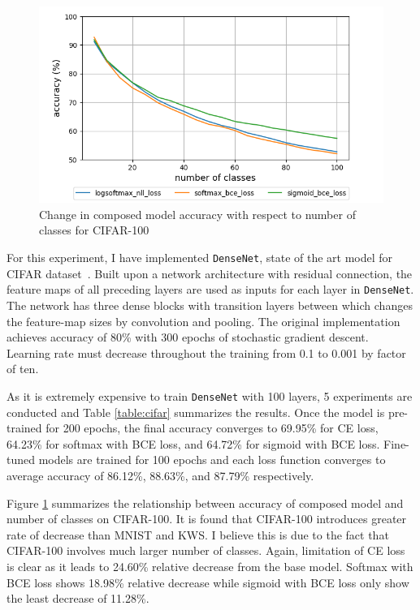 \documentclass{article}
\begin{document}
\begin{figure}[t]
    \centering
    \includegraphics[scale=0.4,trim={0mm 0mm 0mm 0mm},clip]{cifar100.png}
    \caption{Change in composed model accuracy with respect to number of classes for CIFAR-100}
    \label{figure:composed_cifar}
\end{figure}


For this experiment, I have implemented \texttt{DenseNet}, state of the art model for CIFAR dataset~\cite{huang2017densely}. Built upon a network architecture with residual connection, the feature maps of all preceding layers are used as inputs for each layer in \texttt{DenseNet}. The network has three dense blocks with transition layers between which changes the feature-map sizes by convolution and pooling. The original implementation achieves accuracy of 80\% with 300 epochs of stochastic gradient descent. Learning rate must decrease throughout the training from 0.1 to 0.001 by factor of ten.

As it is extremely expensive to train \texttt{DenseNet} with 100 layers, 5 experiments are conducted and Table \ref{table:cifar} summarizes the results. Once the model is pre-trained for 200 epochs, the final accuracy converges to 69.95\% for CE loss, 64.23\% for softmax with BCE loss, and 64.72\% for sigmoid with BCE loss. Fine-tuned models are trained for 100 epochs and each loss function converges to average accuracy of 86.12\%, 88.63\%, and 87.79\% respectively.

Figure \ref{figure:composed_cifar} summarizes the relationship between accuracy of composed model and number of classes on CIFAR-100. It is found that CIFAR-100 introduces greater rate of decrease than MNIST and KWS. I believe this is due to the fact that CIFAR-100 involves much larger number of classes. Again, limitation of CE loss is clear as it leads to 24.60\% relative decrease from the base model. Softmax with BCE loss shows 18.98\% relative decrease while sigmoid with BCE loss only show the least decrease of 11.28\%.
\end{document}
